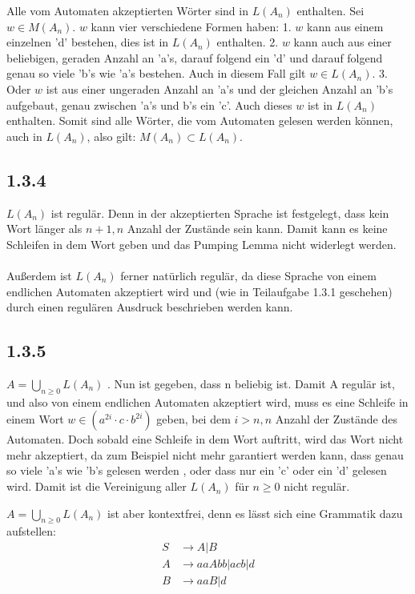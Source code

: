 \documentclass{article}
\begin{document}
Alle vom Automaten akzeptierten Wörter sind in $L(A_n)$ enthalten.
Sei $w \in M(A_n)$. $w$ kann vier verschiedene Formen haben: 1. $w$
kann aus einem einzelnen 'd' bestehen, dies ist in $L(A_n)$
enthalten. 2. $w$ kann auch aus einer beliebigen, geraden Anzahl an
'a's, darauf folgend ein 'd' und darauf folgend genau so viele 'b's
wie 'a's bestehen. Auch in diesem Fall gilt $w \in L(A_n)$. 3. Oder
$w$ ist aus einer ungeraden Anzahl an 'a's und der gleichen Anzahl
an 'b's aufgebaut, genau zwischen 'a's und b's ein 'c'. Auch dieses
$w$ ist in $L(A_n)$ enthalten. Somit sind alle Wörter, die vom
Automaten gelesen werden können, auch in $L(A_n)$, also gilt:
$M(A_n) \subset L(A_n)$. 

\subsection*{1.3.4}

$L(A_n)$ ist regulär. Denn in der akzeptierten Sprache ist
festgelegt, dass kein Wort länger als $n + 1, n$ Anzahl der Zustände
sein kann. Damit kann es keine Schleifen in dem Wort geben und das
Pumping Lemma nicht widerlegt werden.
\\ \\
Außerdem ist $L(A_n)$ ferner natürlich regulär, da diese Sprache von
einem endlichen Automaten akzeptiert wird und (wie in Teilaufgabe 1.3.1
geschehen) durch einen regulären Ausdruck beschrieben werden kann.

\subsection*{1.3.5}
 
 $A = \bigcup_{n \geq 0} L(A_n)$ . Nun ist gegeben, dass n beliebig
ist. Damit A regulär ist, und also von einem endlichen Automaten
akzeptiert wird, muss es eine Schleife in einem Wort $w \in
(a^{2i}\cdot c\cdot b^{2i})$ geben, bei dem $i > n, n$ Anzahl der
Zustände des Automaten. Doch sobald eine Schleife in dem Wort auftritt, 
wird das Wort nicht mehr akzeptiert, da zum Beispiel nicht mehr garantiert werden kann, dass genau so viele 'a's wie 'b's gelesen werden , oder dass nur ein 'c' oder ein 'd' gelesen wird. Damit ist die Vereinigung aller $L(A_n)$ für $n \geq 0$ nicht regulär. 

 $A = \bigcup_{n \geq 0} L(A_n)$ ist aber kontextfrei, denn es lässt sich eine Grammatik dazu aufstellen:
\begin{align*}
 S &\rightarrow A | B \\
 A &\rightarrow aaAbb | acb | d \\
 B &\rightarrow aaB | d 
\end{align*}
 
\end{document}
